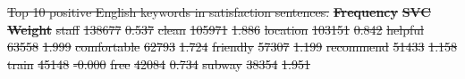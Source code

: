 \documentclass[smallextended,natbib]{svjour3}       %
\providecommand{\DIFdel}[1]{{\protect\color{red}\sout{#1}}}                      %
\providecommand{\DIFdelFL}[1]{\DIFdel{#1}} %
\begin{document}
{%
\DIFdelFL{Top 10 positive English keywords in satisfaction sentences.}}
\textbf{\DIFdelFL{Frequency}} %
\textbf{\DIFdelFL{SVC Weight}} %
\DIFdelFL{staff }%
\DIFdelFL{138677 }%
\DIFdelFL{0.537 }%
\DIFdelFL{clean }%
\DIFdelFL{105971 }%
\DIFdelFL{1.886 }%
\DIFdelFL{location }%
\DIFdelFL{103151 }%
\DIFdelFL{0.842 }%
\DIFdelFL{helpful }%
\DIFdelFL{63558 }%
\DIFdelFL{1.999 }%
\DIFdelFL{comfortable }%
\DIFdelFL{62793 }%
\DIFdelFL{1.724 }%
\DIFdelFL{friendly }%
\DIFdelFL{57307 }%
\DIFdelFL{1.199 }%
\DIFdelFL{recommend }%
\DIFdelFL{51433 }%
\DIFdelFL{1.158 }%
\DIFdelFL{train }%
\DIFdelFL{45148 }%
\DIFdelFL{-0.000 }%
\DIFdelFL{free }%
\DIFdelFL{42084 }%
\DIFdelFL{0.734 }%
\DIFdelFL{subway }%
\DIFdelFL{38354 }%
\DIFdelFL{1.951 }%

\end{document}
